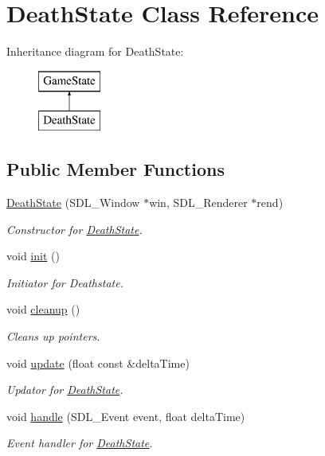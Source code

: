 \hypertarget{class_death_state}{}\section{Death\+State Class Reference}
\label{class_death_state}
Inheritance diagram for Death\+State\+:\begin{figure}[H]
\begin{center}
\leavevmode
\includegraphics[height=2.000000cm]{class_death_state}
\end{center}
\end{figure}
\subsection*{Public Member Functions}
\begin{DoxyCompactItemize}
\item 
\hyperlink{class_death_state_a074c37ab4ffb4a2ccee2c6cb081aa77e}{Death\+State} (S\+D\+L\+\_\+\+Window $\ast$win, S\+D\+L\+\_\+\+Renderer $\ast$rend)
\begin{DoxyCompactList}\small\item\em Constructor for \hyperlink{class_death_state}{Death\+State}. \end{DoxyCompactList}\item 
void \hyperlink{class_death_state_adb482695885013654f7183792310c48e}{init} ()
\begin{DoxyCompactList}\small\item\em Initiator for Deathstate. \end{DoxyCompactList}\item 
void \hyperlink{class_death_state_a881a749aa4eebe860c7eeaa23e3a951c}{cleanup} ()
\begin{DoxyCompactList}\small\item\em Cleans up pointers. \end{DoxyCompactList}\item 
void \hyperlink{class_death_state_a9bafdb9541ae82810753fd7e30ca8c18}{update} (float const \&delta\+Time)
\begin{DoxyCompactList}\small\item\em Updator for \hyperlink{class_death_state}{Death\+State}. \end{DoxyCompactList}\item 
void \hyperlink{class_death_state_a99a1048e47fdd36407a344f1279abe17}{handle} (S\+D\+L\+\_\+\+Event event, float delta\+Time)
\begin{DoxyCompactList}\small\item\em Event handler for \hyperlink{class_death_state}{Death\+State}. \end{DoxyCompactList}\end{DoxyCompactItemize}
